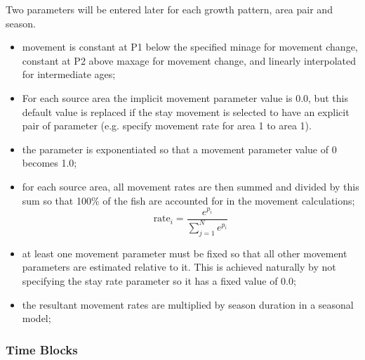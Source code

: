 Two parameters will be entered later for each growth pattern, area pair and season.   
\begin{itemize}
	\item movement is constant at P1 below the specified minage for movement change, constant at P2 above maxage for movement change, and linearly interpolated for intermediate ages;
	\item For each source area the implicit movement parameter value is 0.0, but this default value is replaced if the stay movement is selected to have an explicit pair of parameter (e.g. specify movement rate for area 1 to area 1).
	\item the parameter is exponentiated so that a movement parameter value of 0 becomes 1.0;
	\item for each source area, all movement rates are then summed and divided by this sum so that 100\% of the fish are accounted for in the movement calculations;
	\begin{equation}
	\text{rate}_i = \frac{e^{p_i}}{\sum_{j=1}^{N}e^{p_i}}
	\end{equation}
	\item at least one movement parameter must be fixed so that all other movement parameters are estimated relative to it.  This is achieved naturally by not specifying the stay rate parameter so it has a fixed value of 0.0;
	\item the resultant movement rates are multiplied by season duration in a seasonal model;	
\end{itemize}


\subsubsection{Time Blocks}
	
